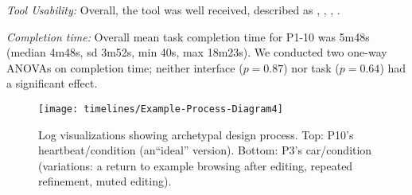 %


\emph{Tool Usability:} Overall, the tool was well received, described as , , %
, .


\emph{Completion time:}
Overall mean task completion time for P1-10 was 5m48s (median 4m48s, sd 3m52s, min 40s, max 18m23s).
We conducted two one-way ANOVAs on  completion time;
neither interface ($p=0.87$) nor task ($p=0.64$) had a significant effect. %



\begin{figure}[tb]
    \centering  
    \texttt{[image: timelines/Example-Process-Diagram4]}
    \caption{Log visualizations showing archetypal design process. Top: P10's heartbeat/\vis condition (an``ideal'' version). Bottom: P3's car/\hi condition (variations: a return to example browsing after editing, repeated refinement, muted editing).
    } 
    \label{fig:archetype}
\end{figure}


